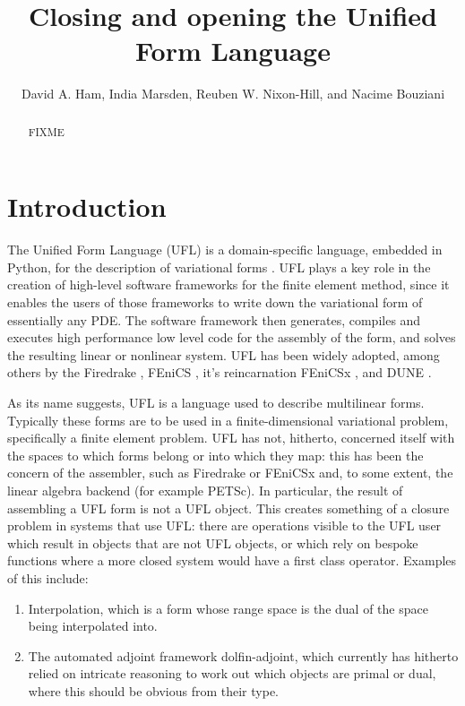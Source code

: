\documentclass[a4paper,11pt]{article}
\title{Closing and opening the Unified Form Language}
\author{David A. Ham, India Marsden, Reuben W. Nixon-Hill, and Nacime Bouziani}
\begin{document}
\maketitle

\begin{abstract}
    FIXME
\end{abstract}

\section{Introduction}

The Unified Form Language (UFL) is a domain-specific language, embedded in Python, for the description of variational forms \parencite{alnaes2014}. UFL plays a key role in the creation of high-level software frameworks for the finite element method, since it enables the users of those frameworks to write down the variational form of essentially any PDE. The software framework then generates, compiles and executes high performance low level code for the assembly of the form, and solves the resulting linear or nonlinear system. UFL has been widely adopted, among others by the Firedrake \parencite{rathgeber2017}, FEniCS \parencite{logg2012}, it's reincarnation FEniCSx \parencite{baratta_2023}, and DUNE \parencite{dedner2020}.

As its name suggests, UFL is a language used to describe multilinear forms. Typically these forms are to be used in a finite-dimensional variational problem, specifically a finite element problem. UFL has not, hitherto, concerned itself with the spaces to which forms belong or into which they map: this has been the concern of the assembler, such as Firedrake or FEniCSx and, to some extent, the linear algebra backend (for example PETSc). In particular, the result of assembling a UFL form is not a UFL object. This creates something of a closure problem in systems that use UFL: there are operations visible to the UFL user which result in objects that are not UFL objects, or which rely on bespoke functions where a more closed system would have a first class operator. Examples of this include:

\begin{enumerate}
    \item Interpolation, which is a form whose range space is the dual of the space being interpolated into.
    \item The automated adjoint framework dolfin-adjoint\parencite{farrell2013, mitusch2019}, which currently has hitherto relied on intricate reasoning to work out which objects are primal or dual, where this should be obvious from their type.
\end{enumerate}
\end{document}
